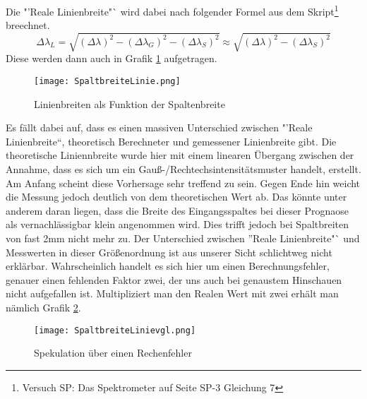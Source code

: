 Die "'Reale Linienbreite"` wird dabei nach folgender Formel aus dem Skript\footnote{Versuch SP: Das Spektrometer auf Seite SP-3 Gleichung 7} breechnet. 
\begin{equation*}
    \Delta \lambda _L = \sqrt{(\Delta \lambda) ^2-(\Delta \lambda_G) ^2-(\Delta \lambda_S) ^2} \approx \sqrt{(\Delta \lambda) ^2-(\Delta \lambda_S) ^2} 
\end{equation*}
Diese werden dann auch in Grafik \ref{RealLin} aufgetragen.
\begin{figure}[h]
    \centering
    \texttt{[image: SpaltbreiteLinie.png]}
    \caption{Linienbreiten als Funktion der Spaltenbreite}
    \label{RealLin}
\end{figure}
Es fällt dabei auf, dass es einen massiven Unterschied zwischen "'Reale Linienbreite"`, theoretisch Berechneter und gemessener Linienbreite gibt. Die theoretische Liniennbreite wurde hier mit einem linearen 
Übergang zwischen der Annahme, dass es sich um ein Gauß-/Rechtechsintensitätsmuster handelt, erstellt. Am Anfang scheint diese Vorhersage sehr treffend zu sein. Gegen Ende hin weicht die Messung 
jedoch deutlich von dem theoretischen Wert ab. Das könnte unter anderem daran liegen, dass die Breite des Eingangsspaltes bei dieser Prognaose als vernachlässigbar klein angenommen wird. 
Dies trifft jedoch bei Spaltbreiten von fast 2mm nicht mehr zu. Der Unterschied zwischen "'Reale Linienbreite"` und Messwerten in dieser Größenordnung ist aus unserer Sicht schlichtweg nicht erklärbar.
Wahrscheinlich handelt es sich hier um einen Berechnungsfehler, genauer einen fehlenden Faktor zwei, der uns auch bei genaustem Hinschauen nicht aufgefallen ist. Multipliziert man den Realen Wert mit zwei 
erhält man nämlich Grafik \ref{Vergleich}.
\begin{figure}[h]
    \centering
    \texttt{[image: SpaltbreiteLinievgl.png]}
    \caption{Spekulation über einen Rechenfehler}
    \label{Vergleich}
\end{figure}

